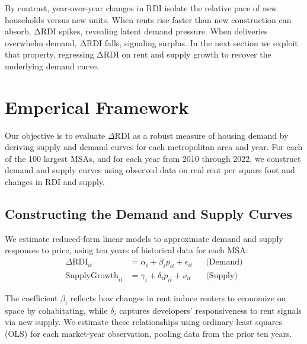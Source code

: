 \documentclass[APA,Times1COL]{WileyNJDv5} %
\begin{document}
By contrast, year-over-year changes in RDI isolate the relative pace of new households versus new units. When rents rise faster than new construction can absorb, ΔRDI spikes, revealing latent demand pressure. When deliveries overwhelm demand, ΔRDI falls, signaling surplus. In the next section we exploit that property, regressing ΔRDI on rent and supply growth to recover the underlying demand curve.



\section{Emperical Framework}
Our objective is to evaluate \( \Delta \text{RDI} \) as a robust measure of housing demand by deriving supply and demand curves for each metropolitan area and year. For each of the 100 largest MSAs, and for each year from 2010 through 2022, we construct demand and supply curves using observed data on real rent per square foot and changes in RDI and supply.

\subsection{Constructing the Demand and Supply Curves}

We estimate reduced-form linear models to approximate demand and supply responses to price, using ten years of historical data for each MSA:
\begin{align*}
	\Delta \text{RDI}_{it} &= \alpha_i + \beta_i p_{it} + \epsilon_{it} && \text{(Demand)} \\
	\text{SupplyGrowth}_{it} &= \gamma_i + \delta_i p_{it} + \nu_{it} && \text{(Supply)}
\end{align*}

The coefficient \( \beta_i \) reflects how changes in rent induce renters to economize on space by cohabitating, while \( \delta_i \) captures developers' responsiveness to rent signals via new supply. We estimate these relationships using ordinary least squares (OLS) for each market-year observation, pooling data from the prior ten years.
\end{document}
